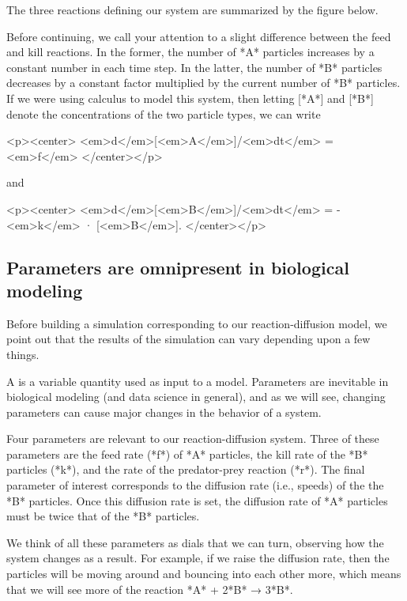 The three reactions defining our system are summarized by the figure below.

{%

Before continuing, we call your attention to a slight difference between the feed and kill reactions. In the former, the number of *A* particles increases by a constant number in each time step. In the latter, the number of *B* particles decreases by a constant factor multiplied by the current number of *B* particles. If we were using calculus to model this system, then letting [*A*] and [*B*] denote the concentrations of the two particle types, we can write

<p><center>
<em>d</em>[<em>A</em>]/<em>dt</em> = <em>f</em>
</center></p>

and

<p><center>
<em>d</em>[<em>B</em>]/<em>dt</em> = -<em>k</em> · [<em>B</em>].
</center></p>

\FloatBarrier
{}
\subsection{Parameters are omnipresent in biological modeling}

Before building a simulation corresponding to our reaction-diffusion model, we point out that the results of the simulation can vary depending upon a few things.

A  is a variable quantity used as input to a model. Parameters are inevitable in biological modeling (and data science in general), and as we will see, changing parameters can cause major changes in the behavior of a system.

Four parameters are relevant to our reaction-diffusion system. Three of these parameters are the feed rate (*f*) of *A* particles, the kill rate of the *B* particles (*k*), and the rate of the predator-prey reaction (*r*). The final parameter of interest corresponds to the diffusion rate (i.e., speeds) of the the *B* particles. Once this diffusion rate is set, the diffusion rate of *A* particles must be twice that of the *B* particles.

We think of all these parameters as dials that we can turn, observing how the system changes as a result. For example, if we raise the diffusion rate, then the particles will be moving around and bouncing into each other more, which means that we will see more of the reaction *A* + 2*B* → 3*B*.

}
